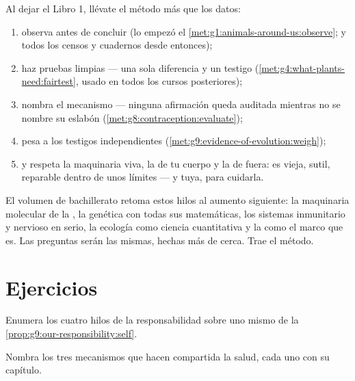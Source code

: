 \begin{method}\label{met:g9:our-responsibility:method}
Al dejar el Libro 1, llévate el método más que los datos:
\begin{enumerate}
  \item observa antes de concluir (lo empezó el
        \cref{met:g1:animals-around-us:observe}; y todos los censos y
        cuadernos desde entonces);
  \item haz pruebas limpias --- una sola diferencia y un testigo
        (\cref{met:g4:what-plants-need:fairtest}, usado en todos los
        cursos posteriores);
  \item nombra el mecanismo --- ninguna afirmación queda auditada
        mientras no se nombre su eslabón
        (\cref{met:g8:contraception:evaluate});
  \item pesa a los testigos independientes
        (\cref{met:g9:evidence-of-evolution:weigh});
  \item y respeta la maquinaria viva, la de tu cuerpo y la de fuera: es
        vieja, sutil, reparable dentro de unos límites --- y tuya, para
        cuidarla.
\end{enumerate}
\end{method}

\begin{remark}\label{rem:g9:our-responsibility:next}
El volumen de bachillerato retoma estos hilos al aumento siguiente: la
maquinaria molecular de la , la genética con todas sus
matemáticas, los sistemas inmunitario y nervioso en serio, la ecología
como ciencia cuantitativa y la  como el marco que es. Las
preguntas serán las mismas, hechas más de cerca. Trae el método.
\end{remark}

\section{Ejercicios}

\begin{exercise}[$\star$]\label{exo:g9:our-responsibility:1}
Enumera los cuatro hilos de la responsabilidad sobre uno mismo de la
\cref{prop:g9:our-responsibility:self}.
\end{exercise}

\begin{exercise}[$\star$]\label{exo:g9:our-responsibility:2}
Nombra los tres mecanismos que hacen compartida la salud, cada uno con
su capítulo.
\end{exercise}

